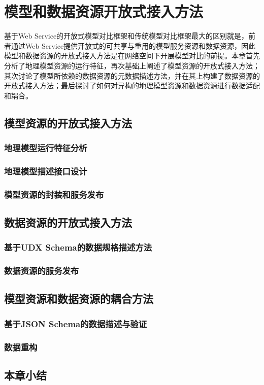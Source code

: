 \chapter{模型和数据资源开放式接入方法}
基于Web Service的开放式模型对比框架和传统模型对比框架最大的区别就是，前者通过Web Service提供开放式的可共享与重用的模型服务资源和数据资源，因此模型和数据资源的开放式接入方法是在网络空间下开展模型对比的前提。本章首先分析了地理模型资源的运行特征，再次基础上阐述了模型资源的开放式接入方法；其次讨论了模型所依赖的数据资源的元数据描述方法，并在其上构建了数据资源的开放式接入方法；最后探讨了如何对异构的地理模型资源和数据资源进行数据适配和耦合。

\section{模型资源的开放式接入方法}


\subsection{地理模型运行特征分析}
\subsection{地理模型描述接口设计}
\subsection{模型资源的封装和服务发布}

\section{数据资源的开放式接入方法}
\subsection{基于UDX Schema的数据规格描述方法}
\subsection{数据资源的服务发布}

\section{模型资源和数据资源的耦合方法}
\subsection{基于JSON Schema的数据描述与验证}
\subsection{数据重构}

\section{本章小结}

